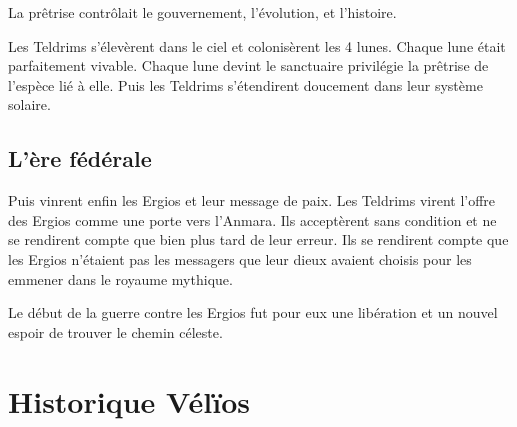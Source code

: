\begin{multicols}{2}
La prêtrise contrôlait le gouvernement, l'évolution, et l'histoire.

Les Teldrims s’élevèrent dans le ciel et colonisèrent les 4 lunes. Chaque lune était parfaitement vivable. Chaque lune devint le sanctuaire privilégie la prêtrise de l’espèce lié à elle. Puis les Teldrims s’étendirent doucement dans leur système solaire.

\section{L’ère fédérale}

Puis vinrent enfin les Ergios et leur message de paix. Les Teldrims virent l’offre des Ergios comme une porte vers l’Anmara. Ils acceptèrent sans condition et ne se rendirent compte que bien plus tard de leur erreur. Ils se rendirent compte que les Ergios n’étaient pas les messagers que leur dieux avaient choisis pour les emmener dans le royaume mythique.

Le début de la guerre contre les Ergios fut pour eux une libération et un nouvel espoir de trouver le chemin céleste.

\end{multicols}

\chapter{Historique Vélïos}

